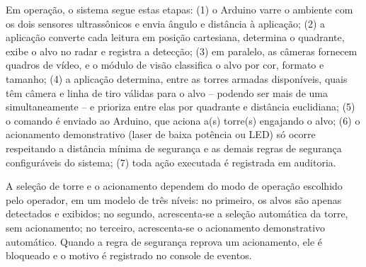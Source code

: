\documentclass[12pt,a4paper]{article}
\begin{document}
Em operação, o sistema segue estas etapas: (1) o Arduino varre o ambiente com os dois sensores
ultrassônicos e envia ângulo e distância à aplicação; (2) a aplicação converte cada leitura em
posição cartesiana, determina o quadrante, exibe o alvo no radar e registra a detecção; (3) em
paralelo, as câmeras fornecem quadros de vídeo, e o módulo de visão classifica o alvo por cor,
formato e tamanho; (4) a aplicação determina, entre as torres armadas disponíveis, quais têm
câmera e linha de tiro válidas para o alvo -- podendo ser mais de uma simultaneamente -- e
prioriza entre elas por quadrante e distância euclidiana; (5) o comando é enviado ao Arduino, que
aciona a(s) torre(s) engajando o alvo;
(6) o acionamento demonstrativo (laser de baixa potência ou LED) só ocorre respeitando a distância
mínima de segurança e as demais regras de segurança configuráveis do sistema; (7) toda ação
executada é registrada em auditoria.

A seleção de torre e o acionamento dependem do modo de operação escolhido pelo operador, em um
modelo de três níveis: no primeiro, os alvos são apenas detectados e exibidos; no segundo,
acrescenta-se a seleção automática da torre, sem acionamento; no terceiro, acrescenta-se o
acionamento demonstrativo automático. Quando a regra de segurança reprova um acionamento, ele é
bloqueado e o motivo é registrado no console de eventos.
\end{document}
